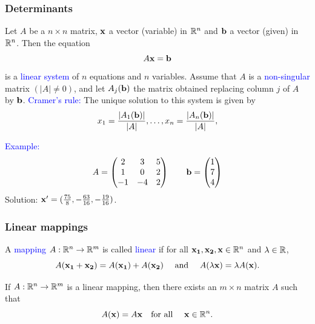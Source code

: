 \documentclass[11pt,aspectratio=169]{beamer}
\begin{document}
\begin{frame}
\frametitle{Determinants}
\begin{small}
Let $A$ be a $n \times n$ matrix, $\bf{x}$ a vector (variable) in $\mathbb R^n$ and $\bf{b}$ a vector (given) in $\mathbb R^n$. Then the equation $$A\bf{x}=\bf{b}$$ is a \textcolor{blue}{linear system} of $n$ equations and $n$ variables.
\vskip 10pt
Assume that $A$ is a \textcolor{blue}{non-singular} matrix $(\vert A \vert \neq 0)$, and let $A_j(\bf{b})$ the matrix obtained replacing column $j$ of $A$ by $\bf{b}$.
\vskip 10pt
\textcolor{blue}{Cramer's rule:} The unique solution to this system is given by
$$
x_1=\frac{\vert A_1(\bf{b})\vert}{\vert A \vert}, \dots, x_n=\frac{\vert A_n(\bf{b})\vert }{\vert A \vert},
$$

\textcolor{blue}{Example:}
 \begin{equation*} 
 A=\begin{pmatrix}
2 & 3 & 5\\
1 & 0 & 2 \\
-1 & -4 & 2
\end{pmatrix}\qquad
\bf{b}= \begin{pmatrix}
1\\
7 \\
4
\end{pmatrix}
\end{equation*}
Solution: ${\bf x}'=(\frac{75}{8},-\frac{63}{16}, -\frac{19}{16})$.

\end{small}
\end{frame}
\begin{frame}
\frametitle{Linear mappings}
\begin{small}
A \textcolor{blue}{mapping} $A: \mathbb{R}^n\rightarrow \mathbb R^m$ is called \textcolor{blue}{linear} if for all ${\bf x_1},  {\bf x_2}, {\bf x} \in \mathbb{R}^n$ and $\lambda \in \mathbb R$,
$$  
A({\bf x_1}+{\bf x_2})=A({\bf x_1})+A({\bf x_2}) \quad \text{ and } \quad
A(\lambda {\bf x})= \lambda A({\bf x}).
$$

\vskip 12pt
If $A:\mathbb{R}^n\rightarrow \mathbb R^m$ is a linear mapping, then there exists an $m \times n$ matrix $A$ such that $$A({\bf x})=A {\bf x} \quad \text{for all }\quad {\bf x} \in \mathbb R^n.$$





\end{small}
\end{frame}
\end{document}
